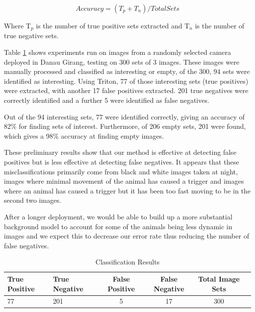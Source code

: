 		\begin{equation}Accuracy = (T_{p} + T_{n})/Total Sets\end{equation}
		
		Where T$_{p}$  is the number of true positive sets extracted and T$_{n}$  is the number of true negative sets.
		
		Table \ref{table:processing} shows experiments run on images from a randomly selected camera deployed in Danau Girang, testing on 300 sets of 3 images. These images were manually processed and classified as interesting or empty, of the 300, 94 sets were identified as interesting. Using Triton, 77 of those interesting sets (true positives) were extracted, with another 17 false positives extracted. 201 true negatives were correctly identified and a further 5 were identified as false negatives. 
		
		Out of the 94 interesting sets, 77 were identified correctly, giving an accuracy of 82\% for finding sets of interest. Furthermore, of 206 empty sets, 201 were found, which gives a 98\% accuracy at finding empty images.
	
		These preliminary results show that our method is effective at detecting false positives but is less effective at detecting false negatives. It appears that these misclassifications primarily come from black and white images taken at night, images where minimal movement of the animal has caused a trigger and images where an animal has caused a trigger but it has been too fast moving to be in the second two images.
		
		After a longer deployment, we would be able to build up a more substantial background model to account for some of the animals being less dynamic in images and we expect this to decrease our error rate thus reducing the number of false negatives. 
		
		\begin{footnotesize}
		\begin{table}
		\centering
			\hfill{}
			\begin{tabular}{|l|l|c|c|c|c|}
				\hline
					True Positive & True Negative & False Positive  & False Negative & Total Image Sets \\
				\hline
					77 & 201 & 5 & 17 & 300 \\
				\hline
			\end{tabular}
			\hfill{}
			\caption{Classification Results}
			\label{table:processing}
		\end{table}
		\end{footnotesize}
		
